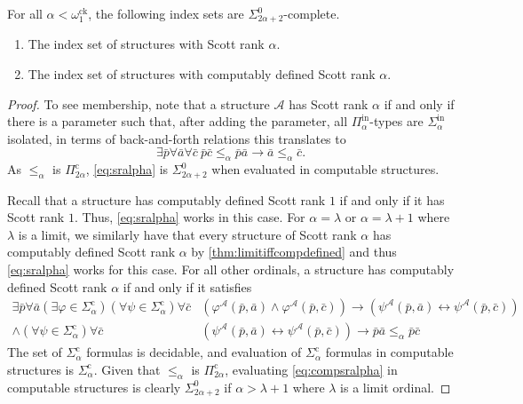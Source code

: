 \documentclass{amsart}
\newcommand\+[1]{\mathcal{#1}}
\renewcommand\*[1]{\mathbf{#1}}
\renewcommand\=[1]{\text{#1}}
\renewcommand\*[1]{\mathbf{#1}}
\renewcommand{\phi}{\varphi}
\newcommand{\Pinf}[1]{\Pi^{\mathrm{in}}_{#1}}
\newcommand{\Picom}[1]{\Pi^{\mathrm{c}}_{#1}}
\newcommand{\Sinf}[1]{\Sigma^{\mathrm{in}}_{#1}}
\newcommand{\Sicom}[1]{\Sigma^{\mathrm{c}}_{#1}}
\newcommand{\ock}{\omega_{1}^{\mathrm{ck}}}
\begin{document}
\begin{theorem}\label{thm:indexsets} 
    For all $\alpha<\ock$, the following index sets are $\Sigma^0_{2\alpha+2}$-complete.
    \begin{enumerate}
      \item The index set of structures with Scott rank $\alpha$.
      \item The index set of structures with computably defined Scott rank $\alpha$.
    \end{enumerate}
  \end{theorem}
  \begin{proof}
    To see membership, note that a structure $\+A$ has Scott rank $\alpha$ if and only if there is a parameter such that, after adding the parameter, all $\Pinf{\alpha}$-types are $\Sinf{\alpha}$ isolated, in terms of back-and-forth relations this translates to
    \begin{equation}\tag{$\ast$}\label{eq:sralpha} \exists \bar p \forall \bar a \forall \bar c\  \bar p\bar c\leq_\alpha\bar p\bar a \to \bar a\leq_\alpha \bar c. 
    \end{equation}
    As $\leq_\alpha$ is $\Picom{2\alpha}$, \cref{eq:sralpha} is $\Sigma^0_{2\alpha+2}$ when evaluated in computable structures.
    
    Recall that a structure has computably defined Scott rank $1$ if and only if it has Scott rank $1$. Thus, \cref{eq:sralpha} works in this case. For $\alpha=\lambda$ or $\alpha=\lambda+1$ where $\lambda$ is a limit, we similarly have that every structure of Scott rank $\alpha$ has computably defined Scott rank $\alpha$ by \cref{thm:limitiffcompdefined} and thus \cref{eq:sralpha} works for this case. For all other ordinals, a structure has computably defined Scott rank $\alpha$ if and only if
    it satisfies
    \begin{equation}\label{eq:compsralpha}\tag{$\star$}
    \begin{aligned} \exists \bar p \forall \bar a (\exists \phi\in \Sicom{\alpha}) (\forall \psi\in \Sicom{\alpha}) \forall \bar c &\left(\phi^\+A(\bar p,\bar a) \land \phi^\+A(\bar p, \bar c) \right)\to \left(\psi^\+A(\bar p, \bar a)\leftrightarrow \psi^\+A(\bar p, \bar c)\right)\\
    \land(\forall \psi\in \Sicom{\alpha} )\forall \bar c & \left(\psi^\+A(\bar p, \bar a)\leftrightarrow \psi^\+A(\bar p, \bar c)\right)\to \bar p\bar a \leq_\alpha \bar p\bar c\end{aligned}
    \end{equation}
    The set of $\Sicom{\alpha}$ formulas is decidable, and evaluation of $\Sicom{\alpha}$ formulas in computable structures is $\Sicom{\alpha}$. Given that $\leq_{\alpha}$ is $\Picom{2\alpha}$, evaluating \cref{eq:compsralpha} in computable structures is clearly $\Sigma^0_{2\alpha+2}$ if $\alpha>\lambda+1$ where $\lambda$ is a limit ordinal.


\end{proof}
\end{document}
